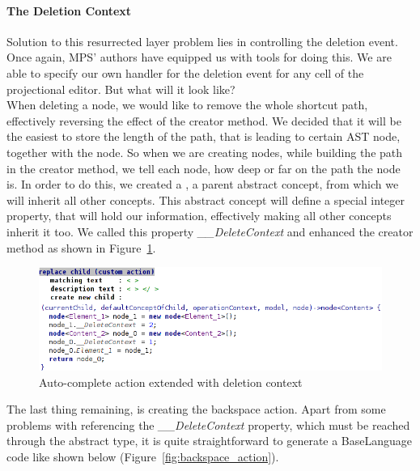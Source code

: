 \paragraph {The Deletion Context}

Solution to this resurrected layer problem lies in controlling the deletion event.
Once again, MPS' authors have equipped us with tools for doing this.
We are able to specify our own handler for the deletion event for any cell of the projectional editor.
But what will it look like?
\\

When deleting a node, we would like to remove the whole shortcut path, effectively reversing the effect of the creator method.
We decided that it will be the easiest to store the length of the path, that is leading to certain AST node, together with the node.
So when we are creating nodes, while building the path in the creator method, we tell each node, how deep or far on the path the node is.
In order to do this, we created a , a parent abstract concept, from which we will inherit all other concepts.
This abstract concept will define a special integer property, that will hold our information, effectively making all other concepts inherit it too.
We called this property \textit{{\_}{\_}DeleteContext} and enhanced the creator method as shown in Figure~\ref{fig:autocomplete_action_delete_context}.

\begin{figure}[h]
	\centering
	\includegraphics[width=\textwidth]{./img/autocomplete_action_delete_context.png}
	\caption{Auto-complete action extended with deletion context}
	\label{fig:autocomplete_action_delete_context}
\end{figure}

The last thing remaining, is creating the backspace action.
Apart from some problems with referencing the \textit{{\_}{\_}DeleteContext} property, which must be reached through the abstract  type, it is quite straightforward to generate a BaseLanguage code like shown below (Figure~\ref{fig:backspace_action}).

